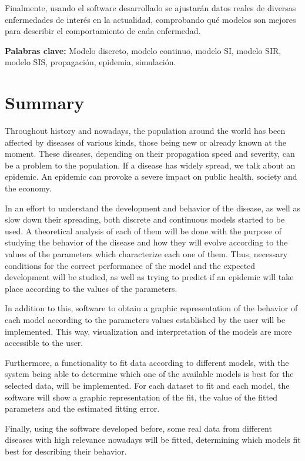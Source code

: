 Finalmente, usando el software desarrollado se ajustarán datos reales de diversas enfermedades de interés en la actualidad, comprobando qué modelos son mejores para describir el comportamiento de cada enfermedad.

\textbf{Palabras clave: } Modelo discreto, modelo continuo, modelo SI, modelo SIR, modelo SIS, propagación, epidemia, simulación.



\chapter*{Summary}

Throughout history and nowadays, the population around the world has been affected by diseases of various kinds, those being new or already known at the moment. These diseases, depending on their propagation speed and severity, can be a problem to the population. If a disease has widely spread, we talk about an epidemic. An epidemic can provoke a severe impact on public health, society and the economy.

In an effort to understand the development and behavior of the disease, as well as slow down their spreading, both discrete and continuous models started to be used. A theoretical analysis of each of them will be done with the purpose of studying the behavior of the disease and how they will evolve according to the values of the parameters which characterize each one of them. Thus, necessary conditions for the correct performance of the model and the expected development will be studied, as well as trying to predict if an epidemic will take place according to the values of the parameters.

In addition to this, software to obtain a graphic representation of the behavior of each model according to the parameters values established by the user will be implemented. This way, visualization and interpretation of the models are more accessible to the user.

Furthermore, a functionality to fit data according to different models, with the system being able to determine which one of the available models is best for the selected data, will be implemented. For each dataset to fit and each model, the software will show a graphic representation of the fit, the value of the fitted parameters and the estimated fitting error.

Finally, using the software developed before, some real data from different diseases with high relevance nowadays will be fitted, determining which models fit best for describing their behavior.

